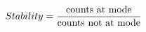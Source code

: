\documentclass[preview]{standalone}
\begin{document}
\begin{align*}
Stability = { \text{counts at mode}  \over  \text{counts not at mode} }
\end{align*}
\end{document}
